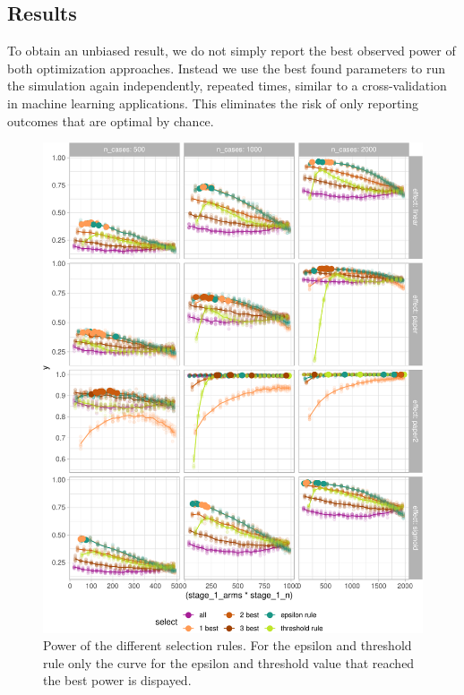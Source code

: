 \documentclass[bimj,fleqn]{w-art}
\theoremstyle{plain}
\theoremstyle{definition}
\begin{document}
\subsection{Results}

To obtain an unbiased result, we do not simply report the best observed power of both optimization approaches.
Instead we use the best found parameters to run the simulation again independently, repeated times, similar to a cross-validation in machine learning applications.
This eliminates the risk of only reporting outcomes that are optimal by chance.

\begin{figure}[htb]
\begin{center}
\includegraphics[width=\linewidth]{generated/figures/plot_allbest.pdf}
\caption{Power of the different selection rules. For the epsilon and threshold rule only the curve for the epsilon and threshold value that reached the best power is dispayed.}
\end{center}
\end{figure}
\end{document}
